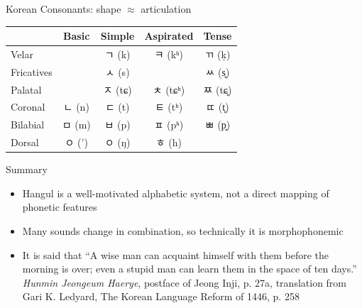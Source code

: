 \documentclass[xetex]{beamer}
\newcommand{\IPA}[1]{{\silipa\selectfont #1}}
\begin{document}
\begin{frame}{Korean Consonants:  shape $\approx$ articulation}

  \begin{center}
    \begin{tabular}{lcccc}
        & \textbf{Basic} & \textbf{Simple} & \textbf{Aspirated} & \textbf{Tense} \\
        \hline
        Velar & & \textkorean{ㄱ} (\IPA{k}) & \textkorean{ㅋ} (\IPA{kʰ}) & \textkorean{ㄲ} (\IPA{ḳ}) \\
        Fricatives & & \textkorean{ㅅ} (\IPA{s}) & & \textkorean{ㅆ} (\IPA{s͈}) \\
        Palatal &   & \textkorean{ㅈ} (\IPA{tɕ}) & \textkorean{ㅊ} (\IPA{tɕʰ}) & \textkorean{ㅉ} (\IPA{tɕ͈}) \\
        Coronal & \textkorean{ㄴ}  (\IPA{n})& \textkorean{ㄷ} (\IPA{t}) & \textkorean{ㅌ} (\IPA{tʰ}) & \textkorean{ㄸ} (\IPA{t͈}) \\
      Bilabial & \textkorean{ㅁ}  (\IPA{m})& \textkorean{ㅂ} (\IPA{p}) & \textkorean{ㅍ} (\IPA{pʰ}) & \textkorean{ㅃ} (\IPA{p͈}) \\
      \hline
      Dorsal & ㅇ (\IPA{'}) & ㅇ (\IPA{ŋ}) &  ㅎ (\IPA{h}) \\
    \end{tabular}
  \end{center}

\end{frame}


\begin{frame}{Summary}
  \begin{itemize}
  \item Hangul is a well-motivated alphabetic system, not a direct mapping of phonetic features
  \item Many sounds change in combination, so technically it is morphophonemic
  \item It is said that ``A wise man can acquaint himself with them before the morning is over; even a stupid man can learn them in the space of ten days.''
\\ \textit{Hunmin Jeongeum Haerye}, postface of Jeong Inji, p. 27a, translation from Gari K. Ledyard, The Korean Language Reform of 1446, p. 258
  \end{itemize}
  
\end{frame}
\end{document}
